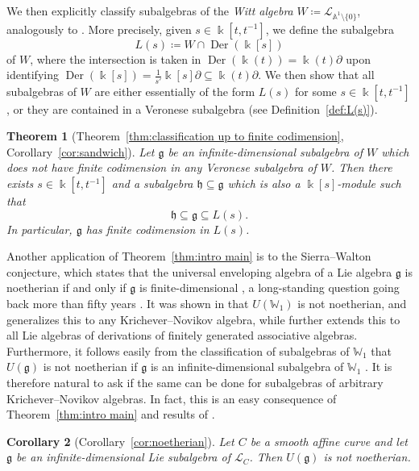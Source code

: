 \documentclass[12pt]{amsart}
\theoremstyle{plain}
\newtheorem{theorem}{Theorem}[section]
\newtheorem{corollary}[theorem]{Corollary}
\theoremstyle{definition}
\numberwithin{equation}{section}
\def\g{\mathfrak{g}}
\def\h{\mathfrak{h}}
\def\L{\mathcal{L}}
\def\Aa{\mathbb{A}}
\def\WW{\mathbb{W}}
\def\kk{\Bbbk}
\DeclareMathOperator{\Der}{Der}
\def\del{\partial}
\def\nonzero{\setminus \{0\}}
\begin{document}
We then explicitly classify subalgebras of the \emph{Witt algebra} $W \coloneqq \L_{\Aa^1 \nonzero}$, analogously to \cite[Theorem 2.8]{BellBuzaglo}. More precisely, given $s \in \kk[t,t^{-1}]$, we define the subalgebra
$$L(s) \coloneqq W \cap \Der(\kk[s])$$
of $W$, where the intersection is taken in $\Der(\kk(t)) = \kk(t)\del$ upon identifying $\Der(\kk[s]) = \frac{1}{s'}\kk[s]\del \subseteq \kk(t)\del$. We then show that all subalgebras of $W$ are either essentially of the form $L(s)$ for some $s \in \kk[t,t^{-1}]$, or they are contained in a Veronese subalgebra (see Definition~\ref{def:L(s)}).

\begin{theorem}[Theorem~\ref{thm:classification up to finite codimension}, Corollary~\ref{cor:sandwich}]\label{thm:intro classification}
    Let $\g$ be an infinite-dimensional subalgebra of $W$ which does not have finite codimension in any Veronese subalgebra of $W$. Then there exists $s \in \kk[t,t^{-1}]$ and a subalgebra $\h \subseteq \g$ which is also a $\kk[s]$-module such that
    $$\h \subseteq \g \subseteq L(s).$$
    In particular, $\g$ has finite codimension in $L(s)$.
\end{theorem}

Another application of Theorem~\ref{thm:intro main} is to the Sierra--Walton conjecture, which states that the universal enveloping algebra of a Lie algebra $\g$ is noetherian if and only if $\g$ is finite-dimensional \cite[Conjecture 0.1]{SierraWalton}, a long-standing question going back more than fifty years \cite{AmayoStewart}. It was shown in \cite{SierraWalton} that $U(\WW_1)$ is not noetherian, and \cite{Buzaglo} generalizes this to any Krichever--Novikov algebra, while \cite{BellBuzaglo2} further extends this to all Lie algebras of derivations of finitely generated associative algebras. Furthermore, it follows easily from the classification of subalgebras of $\WW_1$ that $U(\g)$ is not noetherian if $\g$ is an infinite-dimensional subalgebra of $\WW_1$ \cite[Corollary 4.2]{BellBuzaglo}. It is therefore natural to ask if the same can be done for subalgebras of arbitrary Krichever--Novikov algebras. In fact, this is an easy consequence of Theorem~\ref{thm:intro main} and results of \cite{Buzaglo}.

\begin{corollary}[Corollary~\ref{cor:noetherian}]
    Let $C$ be a smooth affine curve and let $\g$ be an infinite-dimensional Lie subalgebra of $\L_C$. Then $U(\g)$ is not noetherian.
\end{corollary}
\end{document}
